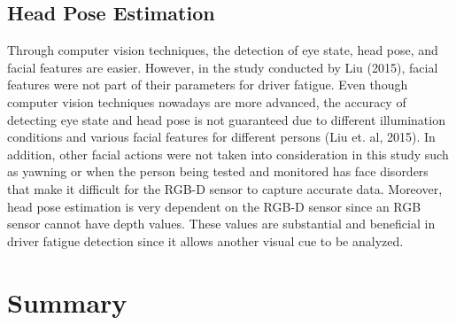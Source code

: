 \subsection{Head Pose Estimation}
Through computer vision techniques, the detection of eye state, head pose, and facial features are easier. However, in the study conducted by Liu (2015), facial features were not part of their parameters for driver fatigue. Even though computer vision techniques nowadays are more advanced, the accuracy of detecting eye state and head pose is not guaranteed due to different illumination conditions and various facial features for different persons (Liu et. al, 2015). In addition, other facial actions were not taken into consideration in this study such as yawning or when the person being tested and monitored has face disorders that make it difficult for the RGB-D sensor to capture accurate data. Moreover, head pose estimation is very dependent on the RGB-D sensor since an RGB sensor cannot have depth values. These values are substantial and beneficial in driver fatigue detection since it allows another visual cue to be analyzed. 


\section{Summary}

